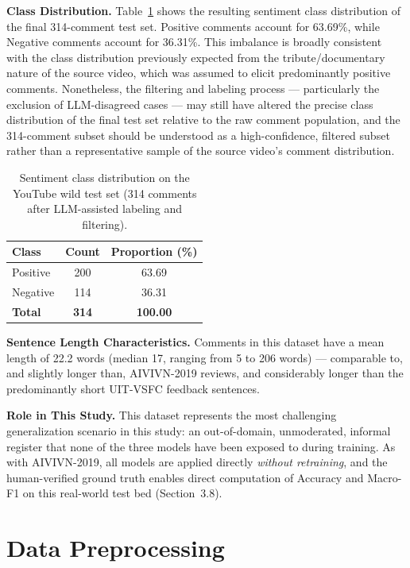 \documentclass[12pt]{report} %
\begin{document}
\textbf{Class Distribution.} Table~\ref{tab:youtube-dist} shows the resulting sentiment class distribution of the final 314-comment test set. Positive comments account for 63.69\%, while Negative comments account for 36.31\%. This imbalance is broadly consistent with the class distribution previously expected from the tribute/documentary nature of the source video, which was assumed to elicit predominantly positive comments. Nonetheless, the filtering and labeling process --- particularly the exclusion of LLM-disagreed cases --- may still have altered the precise class distribution of the final test set relative to the raw comment population, and the 314-comment subset should be understood as a high-confidence, filtered subset rather than a representative sample of the source video's comment distribution.
\begin{table}[htbp]
    \centering
    \caption{Sentiment class distribution on the YouTube wild test set (314 comments after LLM-assisted labeling and filtering).}
    \label{tab:youtube-dist}
    \begin{tabular}{lcc}
        \hline
        \textbf{Class} & \textbf{Count} & \textbf{Proportion (\%)} \\
        \hline
        Positive       & 200            & 63.69                    \\
        Negative       & 114            & 36.31                    \\
        \hline
        \textbf{Total} & \textbf{314}   & \textbf{100.00}          \\
        \hline
    \end{tabular}
\end{table}

\textbf{Sentence Length Characteristics.} Comments in this dataset have a mean length of 22.2 words (median 17, ranging from 5 to 206 words) --- comparable to, and slightly longer than, AIVIVN-2019 reviews, and considerably longer than the predominantly short UIT-VSFC feedback sentences.

\textbf{Role in This Study.} This dataset represents the most challenging generalization scenario in this study: an out-of-domain, unmoderated, informal register that none of the three models have been exposed to during training. As with AIVIVN-2019, all models are applied directly \textit{without retraining}, and the human-verified ground truth enables direct computation of Accuracy and Macro-F1 on this real-world test bed (Section~3.8).


\section{Data Preprocessing}
\end{document}
